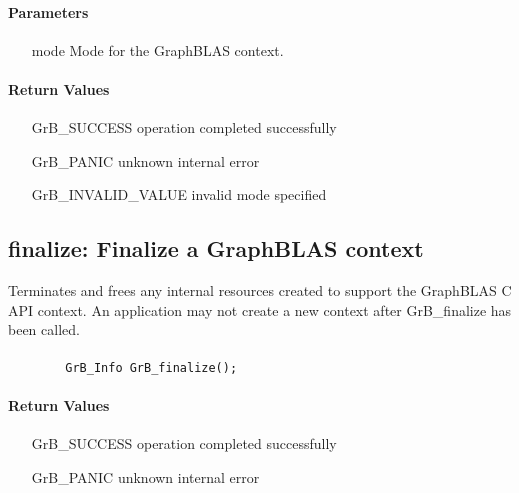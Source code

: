 \paragraph{Parameters}

\begin{itemize}[leftmargin=1.1in]
	\item[{\sf mode}] Mode for the GraphBLAS context.
\end{itemize}

\paragraph{Return Values}


\begin{itemize}[leftmargin=2.1in]
\item[{\sf GrB\_SUCCESS}]           operation completed successfully
\item[{\sf GrB\_PANIC}]             unknown internal error  
\item[{\sf GrB\_INVALID\_VALUE}]    invalid mode specified
\end{itemize}


\subsection{{\sf finalize}: Finalize a GraphBLAS context}

Terminates and frees any internal resources created to 
support the GraphBLAS C API context.
An application may not create a new context after 
{\sf GrB\_finalize} has been called.

\paragraph{\syntax}

\begin{verbatim}
        GrB_Info GrB_finalize();
\end{verbatim}

\paragraph{Return Values}

\begin{itemize}[leftmargin=2.1in]
\item[{\sf GrB\_SUCCESS}]        operation completed successfully
\item[{\sf GrB\_PANIC}]          unknown internal error
\end{itemize}

